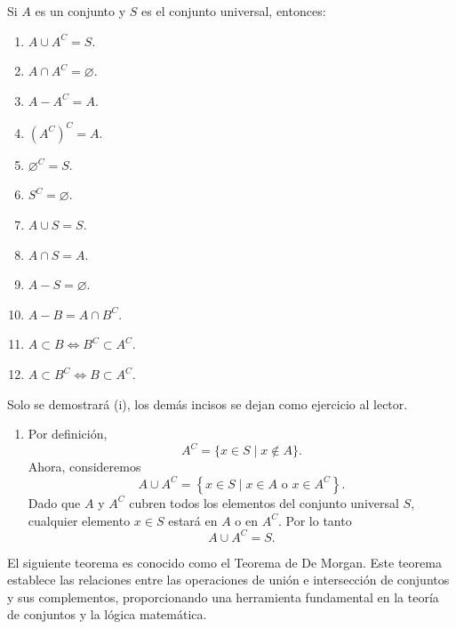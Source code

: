 \begin{prop}{}{}
    Si $A$ es un conjunto y $S$ es el conjunto universal, entonces:
    \begin{enumerate}[label=\roman*., topsep=6pt, itemsep=0pt]
        \item $A \cup A^C = S$.
        \item $A \cap A^C = \varnothing$.
        \item $A - A^C = A$.
        \item $\left(A^C\right)^C = A$.
        \item $\varnothing^C = S$.
        \item $S^C = \varnothing$.
        \item $A \cup S = S$.
        \item $A \cap S = A$.
        \item $A - S = \varnothing$.
        \item $A - B = A \cap B^C$.
        \item $A \subset B \Longleftrightarrow B^C \subset A^C$.
        \item $A \subset B^C \Longleftrightarrow B \subset A^C$.
    \end{enumerate}
    \tcblower
    \demostracion Solo se demostrará (i), los demás incisos se dejan como ejercicio al lector.
    \begin{enumerate}[label=\roman*., topsep=6pt, itemsep=0pt]
        \item Por definición,
        $$A^C = \{x \in S \mid x \notin A\}.$$
        Ahora, consideremos
        $$A \cup A^C = \left\{x \in S \mid x \in A \text{ o } x \in A^C\right\}.$$
        Dado que $A$ y $A^C$ cubren todos los elementos del conjunto universal $S$, cualquier elemento $x \in S$ estará en $A$ o en $A^C$. Por lo tanto
        $$A \cup A^C = S.$$
    \end{enumerate}
\end{prop}

El siguiente teorema es conocido como el Teorema de De Morgan. Este teorema establece las relaciones entre las operaciones de unión e intersección de conjuntos y sus complementos, proporcionando una herramienta fundamental en la teoría de conjuntos y la lógica matemática.

